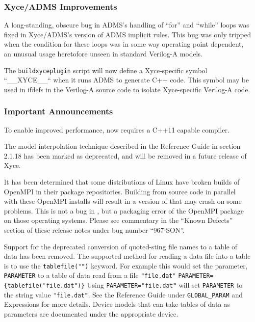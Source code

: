 \documentclass[letterpaper]{scrartcl}
\begin{document}
\subsubsection*{Xyce/ADMS Improvements}
\begin{XyceItemize}
  \item A long-standing, obscure bug in ADMS's handling of ``for'' and
    ``while'' loops was fixed in Xyce/ADMS's version of ADMS implicit
    rules.  This bug was only tripped when the condition for these
    loops was in some way operating point dependent, an unusual usage
    heretofore unseen in standard Verilog-A models.
  \item The \texttt{buildxyceplugin} script will now define a
    Xyce-specific symbol ``\_\_XYCE\_\_`` when it runs ADMS to
    generate C++ code.  This symbol may be used in ifdefs in the
    Verilog-A source code to isolate Xyce-specific Verilog-A code.
\end{XyceItemize}

\subsubsection*{Important Announcements}
\begin{XyceItemize}
\item To enable improved performance, \Xyce{} now requires a C++11 capable
  compiler.
\item The model interpolation technique described in the \Xyce{}
  Reference Guide in section 2.1.18 has been marked as deprecated, and
  will be removed in a future release of Xyce.
\item It has been determined that some distributions of Linux have
  broken builds of OpenMPI in their package repositories.  Building
  \Xyce{} from source code in parallel with these OpenMPI installs
  will result in a version of \Xyce{} that may crash on some problems.
  This is not a bug in \Xyce{}, but a packaging error of the OpenMPI
  package on those operating systems.  Please see commentary in the
  ``Known Defects'' section of these release notes under bug number
  ``967-SON''.
 \item Support for the deprecated conversion of quoted-sting file 
  names to a table of data has been removed.  The supported method
  for reading a data file into a table is to use the \texttt{tablefile("")} keyword. 
  For example this would set the parameter, \texttt{PARAMETER} to a table 
  of data read from a file \texttt{"file.dat"}
  \texttt{PARAMETER=\{tablefile("file.dat")\}} 
  Using \texttt{PARAMETER="file.dat"} will set \texttt{PARAMETER} to the
  string value \texttt{"file.dat"}.  See the \Xyce{} Reference Guide
  under \texttt{GLOBAL\_PARAM} and Expressions for more details.  Device
  models that can take tables of data as parameters are documented
  under the appropriate device. 
\end{XyceItemize}
\end{document}
